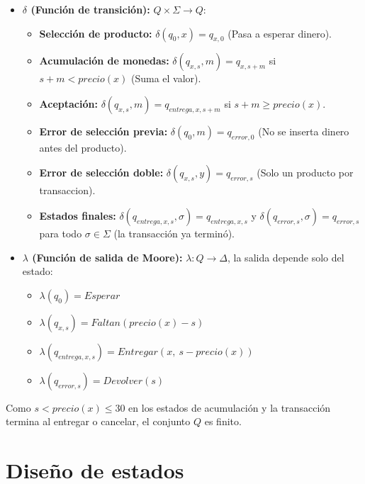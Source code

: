 \documentclass{article}
\begin{document}
\begin{itemize}
    \item \textbf{$\delta$ (Función de transición):} $Q \times \Sigma \to Q$:
    \begin{itemize}
        \item \textbf{Selección de producto:}  $\delta(q_0, x) = q_{x, 0}$ (Pasa a esperar dinero).
        \item \textbf{Acumulación de monedas:} $\delta(q_{x, s}, m) = q_{x, s+m}$ si $s+m < precio(x)$ (Suma el valor).
        \item \textbf{Aceptación:} $\delta(q_{x, s}, m) = q_{entrega, x, s+m}$ si $s+m \ge precio(x)$.
        \item \textbf{Error de selección previa:} $\delta(q_0, m) = q_{error, 0}$ (No se inserta dinero antes del producto).
        \item \textbf{Error de selección doble:}  $\delta(q_{x, s}, y) = q_{error, s}$ (Solo un producto por transaccion).
        \item \textbf{Estados finales:} $\delta(q_{entrega, x, s}, \sigma) = q_{entrega, x, s}$ y $\delta(q_{error, s}, \sigma) = q_{error, s}$ para todo $\sigma \in \Sigma$ (la transacción ya terminó).
    \end{itemize}

    \item \textbf{$\lambda$ (Función de salida de Moore):} $\lambda : Q \to \Delta$, la salida depende solo del estado:
    \begin{itemize}
        \item $\lambda(q_0) = Esperar$
        \item $\lambda(q_{x, s}) = Faltan(precio(x) - s)$
        \item $\lambda(q_{entrega, x, s}) = Entregar(x,\ s - precio(x))$
        \item $\lambda(q_{error, s}) = Devolver(s)$
    \end{itemize}
\end{itemize}

Como $s < precio(x) \le 30$ en los estados de acumulación y la transacción termina al entregar o cancelar, el conjunto $Q$ es finito.

\section{Diseño de estados}
\end{document}
